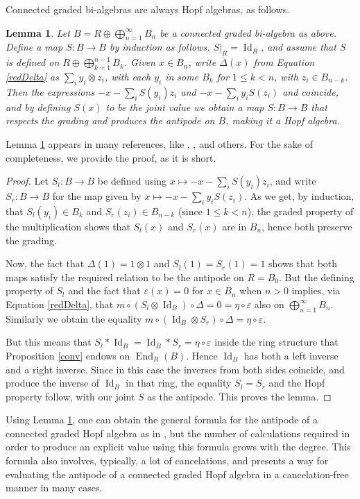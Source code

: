 \documentclass{article}
\newtheorem{lem}[thm]{Lemma}
\theoremstyle{definition}
\begin{document}
Connected graded bi-algebras are always Hopf algebras, as follows.
\begin{lem}
Let $B=R\oplus\bigoplus_{n=1}^{\infty}B_{n}$ be a connected graded bi-algebra as above. Define a map $S:B \to B$ by induction as follows. $S|_{R}=\operatorname{Id}_{R}$, and assume that $S$ is defined on $R\oplus\bigoplus_{k=1}^{n-1}B_{k}$. Given $x \in B_{n}$, write $\overline{\Delta}(x)$ from Equation \eqref{redDelta} as $\sum_{i}y_{i} \otimes z_{i}$, with each $y_{i}$ in some $B_{k}$ for $1 \leq k<n$, with $z_{i} \in B_{n-k}$. Then the expressions $-x-\sum_{i}S(y_{i})z_{i}$ and $-x-\sum_{i}y_{i}S(z_{i})$ and coincide, and by defining $S(x)$ to be the joint value we obtain a map $S:B \to B$ that respects the grading and produces the antipode on $B$, making it a Hopf algebra.
\label{grconS}
\end{lem}
Lemma \ref{grconS} appears in many references, like \cite{[E]}, \cite{[LMvW]}, and others. For the sake of completeness, we provide the proof, as it is short.
\begin{proof}
Let $S_{l}:B \to B$ be defined using $x\mapsto-x-\sum_{i}S(y_{i})z_{i}$, and write $S_{r}:B \to B$ for the map given by $x\mapsto-x-\sum_{i}y_{i}S(z_{i})$. As we get, by induction, that $S_{l}(y_{i}) \in B_{k}$ and $S_{r}(z_{i}) \in B_{n-k}$ (since $1 \leq k<n$), the graded property of the multiplication shows that $S_{l}(x)$ and $S_{r}(x)$ are in $B_{n}$, hence both preserve the grading.

Now, the fact that $\Delta(1)=1\otimes1$ and $S_{l}(1)=S_{r}(1)=1$ shows that both maps satisfy the required relation to be the antipode on $R=B_{0}$. But the defining property of $S_{l}$ and the fact that $\varepsilon(x)=0$ for $x \in B_{n}$ when $n>0$ implies, via Equation \eqref{redDelta}, that $m\circ(S_{l}\otimes\operatorname{Id}_{B})\circ\Delta=0=\eta\circ\varepsilon$ also on $\bigoplus_{n=1}^{\infty}B_{n}$. Similarly we obtain the equality $m\circ(\operatorname{Id}_{B} \otimes S_{r})\circ\Delta=\eta\circ\varepsilon$.

But this means that $S_{l}*\operatorname{Id}_{B}=\operatorname{Id}_{B}*S_{r}=\eta\circ\varepsilon$ inside the ring structure that Proposition \ref{conv} endows on $\operatorname{End}_{R}(B)$. Hence $\operatorname{Id}_{B}$ has both a left inverse and a right inverse. Since in this case the inverses from both sides coincide, and produce the inverse of $\operatorname{Id}_{B}$ in that ring, the equality $S_{l}=S_{r}$ and the Hopf property follow, with our joint $S$ as the antipode. This proves the lemma.
\end{proof}
Using Lemma \ref{grconS}, one can obtain the general formula for the antipode of a connected graded Hopf algebra as in \cite{[T]}, but the number of calculations required in order to produce an explicit value using this formula grows with the degree. This formula also involves, typically, a lot of cancelations, and \cite{[BS]} presents a way for evaluating the antipode of a connected graded Hopf algebra in a cancelation-free manner in many cases.
\end{document}
